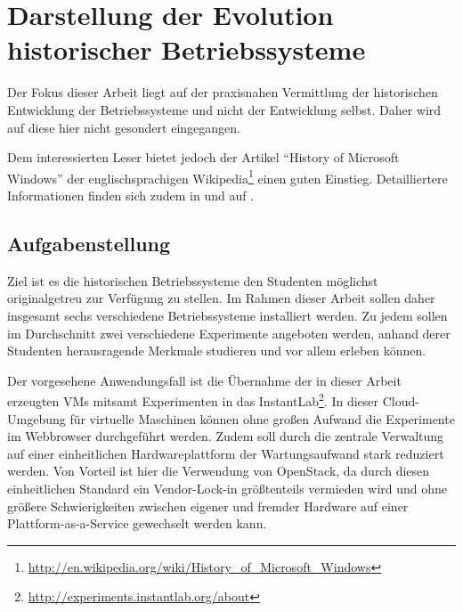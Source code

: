\chapter{Darstellung der Evolution historischer Betriebssysteme}
\label{chap:challenges}

Der Fokus dieser Arbeit liegt auf der praxisnahen Vermittlung der historischen Entwicklung der Betriebssysteme und nicht der Entwicklung selbst. Daher wird auf diese hier nicht gesondert eingegangen.

Dem interessierten Leser bietet jedoch der Artikel "`History of Microsoft Windows"' der englischsprachigen Wikipedia\footnote{\url{http://en.wikipedia.org/wiki/History_of_Microsoft_Windows}} einen guten Einstieg.
Detailliertere Informationen finden sich zudem in \cite{WinInt1} und auf \cite{WinHistory}.

\section{Aufgabenstellung}
\label{sec:aims}


		Ziel ist es die historischen Betriebssysteme den Studenten möglichst originalgetreu zur Verfügung zu stellen. 
		Im Rahmen dieser Arbeit sollen daher insgesamt sechs verschiedene Betriebssysteme installiert werden. 
		Zu jedem sollen im Durchschnitt zwei verschiedene Experimente angeboten werden, anhand derer Studenten herausragende Merkmale studieren und vor allem erleben können.

		Der vorgesehene Anwendungsfall ist die Übernahme der in dieser Arbeit erzeugten VMs mitsamt Experimenten in das InstantLab\footnote{\url{http://experiments.instantlab.org/about}}. 
		In dieser Cloud-Umgebung für virtuelle Maschinen können ohne großen Aufwand die Experimente im Webbrowser durchgeführt werden. 
		Zudem soll durch die zentrale Verwaltung auf einer einheitlichen Hardwareplattform der Wartungsaufwand stark reduziert werden.
		Von Vorteil ist hier die Verwendung von OpenStack, da durch diesen einheitlichen Standard ein Vendor-Lock-in größtenteils vermieden wird und ohne größere Schwierigkeiten zwischen eigener und fremder Hardware auf einer Plattform-as-a-Service gewechselt werden kann.


